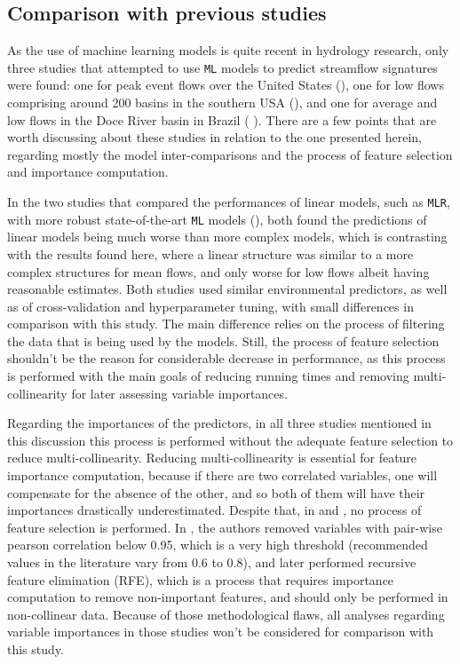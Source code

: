 \documentclass[12pt]{article}
\begin{document}
\subsection{Comparison with previous studies} \label{discussion:previous}

\par As the use of machine learning models is quite recent in hydrology research, only three studies that attempted to use \texttt{ML} models to predict streamflow signatures were found: one for peak event flows over the United States (\cite{potdar2021}), one for low flows comprising around 200 basins in the southern USA (\cite{worland2018}), and one for average and low flows in the Doce River basin in Brazil ( \cite{ferreira2021}). There are a few points that are worth discussing about these studies in relation to the one presented herein, regarding mostly the model inter-comparisons and the process of feature selection and importance computation.

\par In the two studies that compared the performances of linear models, such as \texttt{MLR}, with more robust state-of-the-art \texttt{ML} models (\cite{ferreira2021, worland2018}), both found the predictions of linear models being much worse than more complex models, which is contrasting with the results found here, where a linear structure was similar to a more complex structures for mean flows, and only worse for low flows albeit having reasonable estimates. Both studies used similar environmental predictors, as well as of cross-validation and hyperparameter tuning, with small differences in comparison with this study. The main difference relies on the process of filtering the data that is being used by the models. Still, the process of feature selection shouldn’t be the reason for considerable decrease in performance, as this process is performed with the main goals of reducing running times and removing multi-collinearity for later assessing variable importances.

\par Regarding the importances of the predictors, in all three studies mentioned in this discussion this process is performed without the adequate feature selection to reduce multi-collinearity. Reducing multi-collinearity is essential for feature importance computation, because if there are two correlated variables, one will compensate for the absence of the other, and so both of them will have their importances drastically underestimated. Despite that, in \cite{worland2018} and \cite{potdar2021}, no process of feature selection is performed. In \cite{ferreira2021}, the authors removed variables with pair-wise pearson correlation below 0.95, which is a very high threshold (recommended values in the literature vary from 0.6 to 0.8), and later performed recursive feature elimination (RFE), which is a process that requires importance computation to remove non-important features, and should only be performed in non-collinear data. Because of those methodological flaws, all analyses regarding variable importances in those studies won’t be considered for comparison with this study.
\end{document}
